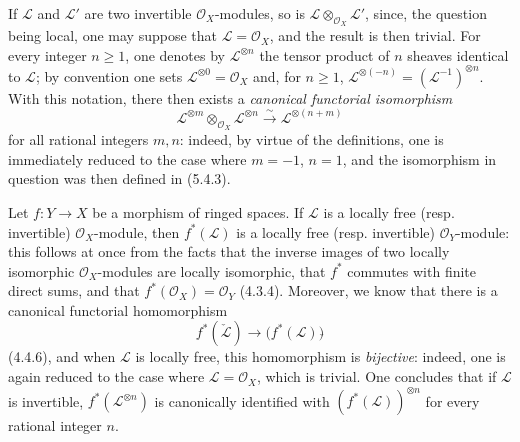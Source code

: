 \begin{env}[5.4.4]
\label{0.5.4.4}
If $\mathcal{L}$ and $\mathcal{L}'$ are two invertible $\mathcal{O}_X$-modules,
so is $\mathcal{L}\otimes_{\mathcal{O}_X}\mathcal{L}'$, since, the question being
local, one may suppose that $\mathcal{L}=\mathcal{O}_X$, and the result is
then trivial. For every integer $n\geq1$, one denotes by
$\mathcal{L}^{\otimes n}$ the tensor product of $n$ sheaves
identical to $\mathcal{L}$; by convention one sets
$\mathcal{L}^{\otimes0}=\mathcal{O}_X$ and, for $n\geq1$,
$\mathcal{L}^{\otimes(-n)}=(\mathcal{L}^{-1})^{\otimes n}$. With this
notation, there then exists a \emph{canonical functorial isomorphism}
\[
  \mathcal{L}^{\otimes m}\otimes_{\mathcal{O}_X}\mathcal{L}^{\otimes n}
  \xrightarrow{\sim}
  \mathcal{L}^{\otimes(n+m)}
  \tag{5.4.4.1}\label{0.5.4.4.1}
\]
for all rational integers $m,n$: indeed, by virtue of the
definitions, one is immediately reduced to the case where $m=-1$, $n=1$, and
the isomorphism in question was then defined in (5.4.3).
\end{env}

\begin{env}[5.4.5]\label{0.5.4.5}
Let $f:Y\to X$ be a morphism of ringed spaces. If $\mathcal{L}$ is a
locally free (resp. invertible) $\mathcal{O}_X$-module, then
$f^*(\mathcal{L})$ is a locally free (resp.
invertible) $\mathcal{O}_Y$-module: this follows at once from the facts that the inverse images of two
locally isomorphic $\mathcal{O}_X$-modules are locally isomorphic, that
$f^*$ commutes with finite direct sums, and that
$f^*(\mathcal{O}_X)=\mathcal{O}_Y$ (4.3.4). Moreover, we know that there is a
canonical functorial homomorphism
\[
  f^*(\check{\mathcal{L}})
  \longrightarrow
  \bigl(f^*(\mathcal{L})\bigr)\check{}
\]
(4.4.6), and when $\mathcal{L}$ is locally free, this homomorphism is
\emph{bijective}: indeed, one is again reduced to the case where
$\mathcal{L}=\mathcal{O}_X$, which is trivial. One concludes that if
$\mathcal{L}$ is invertible, $f^*(\mathcal{L}^{\otimes n})$ is canonically
identified with $(f^*(\mathcal{L}))^{\otimes n}$ for every rational integer
$n$.
\end{env}

